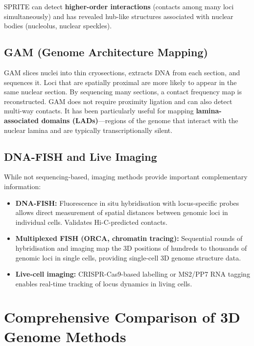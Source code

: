 SPRITE can detect \textbf{higher-order interactions} (contacts among many loci simultaneously) and has revealed hub-like structures associated with nuclear bodies (nucleolus, nuclear speckles).

\subsection{GAM (Genome Architecture Mapping)}
\label{subsec:3dgenome:gam}

GAM slices nuclei into thin cryosections, extracts DNA from each section, and sequences it. Loci that are spatially proximal are more likely to appear in the same nuclear section. By sequencing many sections, a contact frequency map is reconstructed. GAM does not require proximity ligation and can also detect multi-way contacts. It has been particularly useful for mapping \textbf{lamina-associated domains (LADs)}---regions of the genome that interact with the nuclear lamina and are typically transcriptionally silent.

\subsection{DNA-FISH and Live Imaging}
\label{subsec:3dgenome:imaging}

While not sequencing-based, imaging methods provide important complementary information:

\begin{itemize}[itemsep=2pt]
  \item \textbf{DNA-FISH:} Fluorescence in situ hybridisation with locus-specific probes allows direct measurement of spatial distances between genomic loci in individual cells. Validates Hi-C-predicted contacts.
  \item \textbf{Multiplexed FISH (ORCA, chromatin tracing):} Sequential rounds of hybridisation and imaging map the 3D positions of hundreds to thousands of genomic loci in single cells, providing single-cell 3D genome structure data.
  \item \textbf{Live-cell imaging:} CRISPR-Cas9-based labelling or MS2/PP7 RNA tagging enables real-time tracking of locus dynamics in living cells.
\end{itemize}

\section{Comprehensive Comparison of 3D Genome Methods}
\label{sec:3dgenome:comparison}

